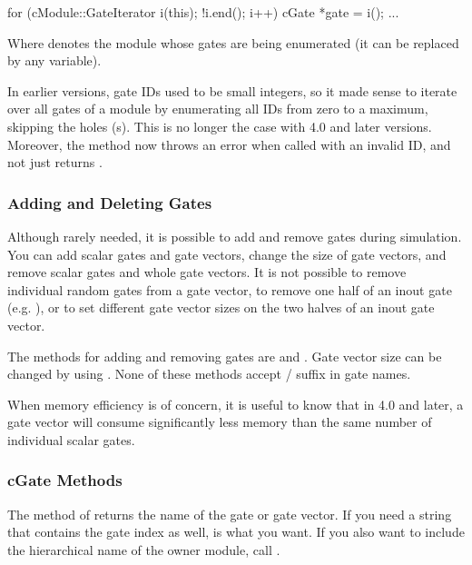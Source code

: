 \begin{cpp}
for (cModule::GateIterator i(this); !i.end(); i++) {
    cGate *gate = i();
    ...
}
\end{cpp}

Where  denotes the module whose gates are being enumerated
(it can be replaced by any  variable).

\begin{note}
    In earlier {\opp} versions, gate IDs used to be small integers, so
    it made sense to iterate over all gates of a module by enumerating
    all IDs from zero to a maximum, skipping the holes (s).
    This is no longer the case with {\opp} 4.0 and later versions.
    Moreover, the  method now throws an error when called
    with an invalid ID, and not just returns .
\end{note}


\subsubsection{Adding and Deleting Gates}

Although rarely needed, it is possible to add and remove gates during
simulation. You can add scalar gates and gate vectors, change the size of
gate vectors, and remove scalar gates and whole gate vectors.
It is not possible to remove individual random gates from a gate vector,
to remove one half of an inout gate (e.g. ), or to set
different gate vector sizes on the two halves of an inout gate vector.

The  methods for adding and removing gates are
 and .
Gate vector size can be changed by using .
None of these methods accept  /  suffix in gate names.

\begin{note}
    When memory efficiency is of concern, it is useful to know that
    in {\opp} 4.0 and later, a gate vector will consume significantly less
    memory than the same number of individual scalar gates.
\end{note}


\subsubsection{cGate Methods}

The  method of  returns the name of the
gate or gate vector. If you need a string that contains the gate index
as well,  is what you want. If you also want to
include the hierarchical name of the owner module, call .

